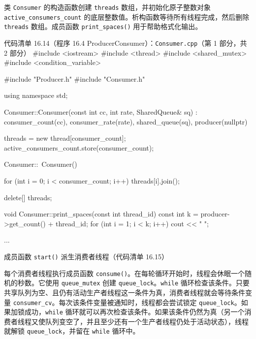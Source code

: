 \par
{}\par
{}\par
{}\par
{}\par
{}\par

类 \texttt{Consumer} 的构造函数创建 \texttt{threads} 数组，并初始化原子整数对象 \texttt{active\_\allowbreak{}consumers\_\allowbreak{}count} 的底层整数值。析构函数等待所有线程完成，然后删除 \texttt{threads} 数组。成员函数 \texttt{print\_\allowbreak{}spaces(\allowbreak{})\allowbreak{}} 用于帮助格式化输出。

\begin{codeboxt}{代码清单 16.14（程序 16.4 ProducerConsumer）：\texttt{Consumer.\allowbreak{}cpp}（第 1 部分，共 2 部分）}
#include <iostream>
#include <thread>
#include <shared_mutex>
#include <condition_variable>

#include "Producer.h"
#include "Consumer.h"

using namespace std;

Consumer::Consumer(const int cc, int rate, SharedQueue& sq)
    : consumer_count(cc), consumer_rate(rate),
      shared_queue(sq), producer(nullptr)

{
    threads = new thread[consumer_count];
    active_consumers_count.store(consumer_count);
}

Consumer::~Consumer()
{
    for (int i = 0; i < consumer_count; i++)
    {
        threads[i].join();
    }

    delete[] threads;
}

void Consumer::print_spaces(const int thread_id) const
{
    int k = producer->get_count() + thread_id;
    for (int i = 1; i < k; i++) cout << "              ";
}

...
\end{codeboxt}

成员函数 \texttt{start()} 派生消费者线程（代码清单 16.15）

每个消费者线程执行成员函数 \texttt{consume()}。在每轮循环开始时，线程会休眠一个随机的秒数。它使用 \texttt{queue\_\allowbreak{}mutex} 创建 \texttt{queue\_\allowbreak{}lock}。\texttt{while} 循环检查该条件。只要共享队列为空、且仍有活动生产者线程这一条件为真，消费者线程就会等待条件变量 \texttt{consumer\_\allowbreak{}cv}。每次该条件变量被通知时，线程都会尝试锁定 \texttt{queue\_\allowbreak{}lock}。如果加锁成功，\texttt{while} 循环就可以再次检查该条件。如果该条件仍然为真（另一个消费者线程又使队列变空了，并且至少还有一个生产者线程仍处于活动状态），线程就解锁 \texttt{queue\_\allowbreak{}lock}，并留在 \texttt{while} 循环中。

